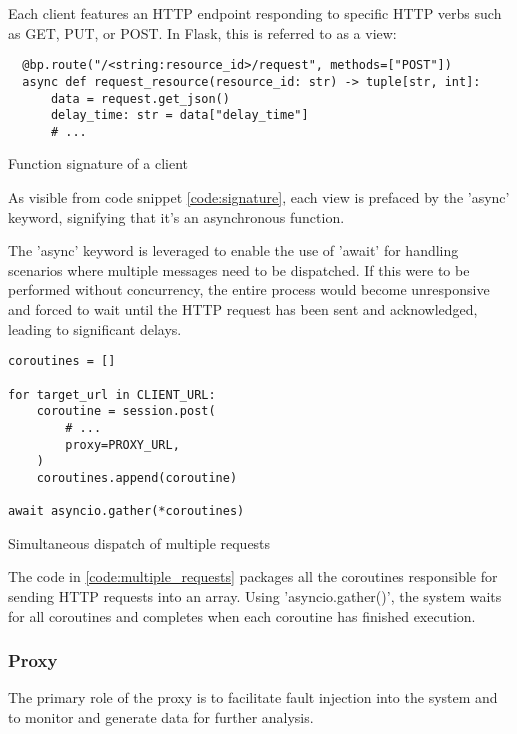Each client features an HTTP endpoint responding to specific HTTP verbs such as GET, PUT, or POST. In Flask, this is referred to as a view:

\begin{listing}[!ht]
  \begin{verbatim}
  @bp.route("/<string:resource_id>/request", methods=["POST"])
  async def request_resource(resource_id: str) -> tuple[str, int]:
      data = request.get_json()
      delay_time: str = data["delay_time"]
      # ...
  \end{verbatim}
\caption{Function signature of a client}
\label{code:signature}
\end{listing}

As visible from code snippet \ref{code:signature}, each view is prefaced by the 'async' keyword, signifying that it's an asynchronous function. 

The 'async' keyword is leveraged to enable the use of 'await' for handling scenarios where multiple messages need to be dispatched. If this were to be performed without concurrency, the entire process would become unresponsive and forced to wait until the HTTP request has been sent and acknowledged, leading to significant delays.

\begin{listing}[!ht]
\begin{verbatim}
coroutines = []

for target_url in CLIENT_URL:
    coroutine = session.post(
        # ...
        proxy=PROXY_URL,
    )
    coroutines.append(coroutine)

await asyncio.gather(*coroutines)
\end{verbatim}
\caption{Simultaneous dispatch of multiple requests}
\label{code:multiple_requests}
\end{listing}

The code in \ref{code:multiple_requests} packages all the coroutines responsible for sending HTTP requests into an array. Using 'asyncio.gather()', the system waits for all coroutines and completes when each coroutine has finished execution.

\subsubsection{Proxy}

The primary role of the proxy is to facilitate fault injection into the system and to monitor and generate data for further analysis.

